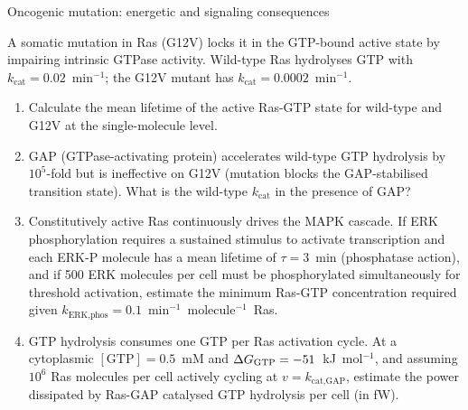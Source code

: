 \documentclass[12pt, a4paper, oneside]{report}
\begin{document}
\begin{problem}{\enspace{}
  \enspace{}\enspace{}\enspace
  Oncogenic mutation: energetic and signaling consequences}

  A somatic mutation in Ras (G12V) locks it in the GTP-bound active
  state by impairing intrinsic GTPase activity. Wild-type Ras
  hydrolyses GTP with $k_\text{cat} = 0.02$~min$^{-1}$; the G12V
  mutant has $k_\text{cat} = 0.0002$~min$^{-1}$.

  \begin{enumerate}
    \item Calculate the mean lifetime of the active Ras-GTP state
          for wild-type and G12V at the single-molecule level.
    \item GAP (GTPase-activating protein) accelerates wild-type GTP
          hydrolysis by $10^5$-fold but is ineffective on G12V
          (mutation blocks the GAP-stabilised transition state).
          What is the wild-type $k_\text{cat}$ in the presence of GAP?
    \item Constitutively active Ras continuously drives the MAPK
          cascade. If ERK phosphorylation requires a sustained
          stimulus to activate transcription and each ERK-P molecule
          has a mean lifetime of $\tau = 3$~min (phosphatase action),
          and if 500 ERK molecules per cell must be phosphorylated
          simultaneously for threshold activation, estimate the
          minimum Ras-GTP concentration required given
          $k_\text{ERK,phos} = 0.1$~min$^{-1}$~molecule$^{-1}$~Ras.
    \item GTP hydrolysis consumes one GTP per Ras activation cycle.
          At a cytoplasmic $[\text{GTP}] = 0.5$~mM and
          $\Delta G_\text{GTP} = -51$~kJ~mol$^{-1}$, and assuming
          $10^6$ Ras molecules per cell actively cycling at $v = k_\text{cat,GAP}$,
          estimate the power dissipated by Ras-GAP catalysed GTP
          hydrolysis per cell (in fW).
  \end{enumerate}
\end{problem}
\end{document}
